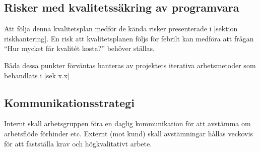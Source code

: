 \documentclass[a4paper,10pt]{article}
\begin{document}
\subsection{Risker med kvalitetssäkring av programvara}
Att följa denna kvalitetsplan medför de kända risker presenterade i [sektion riskhantering].  En risk att kvalitetsplanen följs för febrilt kan medföra att frågan “Hur mycket får kvalitét kosta?” behöver ställas.

Båda dessa punkter förväntas hanteras av projektets iterativa arbetsmetoder som behandlats i [sek x.x]

\subsection{Kommunikationsstrategi}
Internt skall arbetsgruppen föra en daglig kommunikation för att avstämma om arbetsflöde förhinder etc.
Externt (mot kund) skall avstämningar hållas veckovis för att fastställa krav och högkvalitativt arbete.
\end{document}
